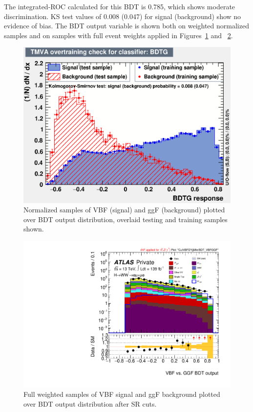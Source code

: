 The integrated-ROC calculated for this BDT is 0.785, which shows moderate discrimination. KS test values of 0.008 (0.047) for signal (background) show no evidence of bias. The BDT output variable is shown both on weighted normalized samples and on samples with full event weights applied in Figures~\ref{fig:ggFVBFBDTresult} and ~\ref{fig:ggFVBFBDTresult2}. 

\begin{figure}[!htbp]
\centering
  \includegraphics[width=.45\linewidth]{Pictures/ggFVBF/overtrain_BDTG.eps}
\caption{Normalized samples of VBF (signal) and ggF (background) plotted over BDT output distribution, overlaid testing and training samples shown.}
\label{fig:ggFVBFBDTresult}
\end{figure}

\begin{figure}[!htbp]
\centering
  \includegraphics[width=.45\linewidth]{Pictures/run2-emme-CutVBFDYjjMin-BDT_VBFGGF-log.pdf}
\caption{Full weighted samples of VBF signal and ggF background plotted over BDT output distribution after SR cuts.}
\label{fig:ggFVBFBDTresult2}
\end{figure}

%


